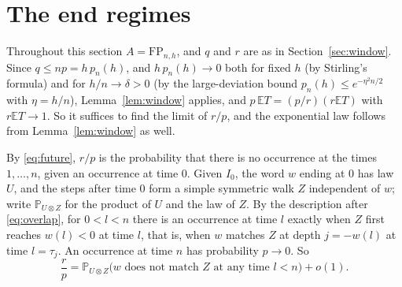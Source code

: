 \documentclass[11pt]{amsart}
\theoremstyle{remark}
\numberwithin{equation}{section}
\newcommand{\PP}{\mathbb{P}}
\newcommand{\EE}{\mathbb{E}}
\newcommand{\FP}{\mathrm{FP}}
\begin{document}
\section{The end regimes}\label{sec:ends}

Throughout this section $A=\FP_{n,h}$, and $q$ and $r$ are as in Section~\ref{sec:window}. Since $q\le np=h\,p_n(h)$, and $h\,p_n(h)\to0$ both for fixed $h$ (by Stirling's formula) and for $h/n\to\delta>0$ (by the large-deviation bound $p_n(h)\le e^{-\eta^2n/2}$ with $\eta=h/n$), Lemma~\ref{lem:window} applies, and $p\,\EE T=(p/r)(r\EE T)$ with $r\EE T\to1$. So it suffices to find the limit of $r/p$, and the exponential law follows from Lemma~\ref{lem:window} as well.

By \eqref{eq:future}, $r/p$ is the probability that there is no occurrence at the times $1,\dots,n$, given an occurrence at time $0$. Given $I_0$, the word $w$ ending at $0$ has law $U$, and the steps after time $0$ form a simple symmetric walk $Z$ independent of $w$; write $\PP_{U\otimes Z}$ for the product of $U$ and the law of $Z$. By the description after \eqref{eq:overlap}, for $0<l<n$ there is an occurrence at time $l$ exactly when $Z$ first reaches $w(l)<0$ at time $l$, that is, when $w$ matches $Z$ at depth $j=-w(l)$ at time $l=\tau_j$. An occurrence at time $n$ has probability $p\to0$. So
\begin{equation}\label{eq:rp}
\frac rp=\PP_{U\otimes Z}\bigl(w\text{ does not match $Z$ at any time }l<n\bigr)+o(1).
\end{equation}
\end{document}
